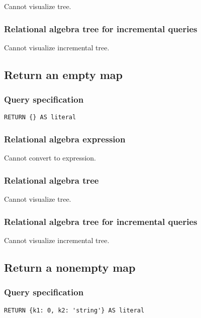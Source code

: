 Cannot visualize tree.

\subsubsection*{Relational algebra tree for incremental queries}

Cannot visualize incremental tree.

\subsection{Return an empty map}

\subsubsection*{Query specification}

\begin{lstlisting}
RETURN {} AS literal
\end{lstlisting}

\subsubsection*{Relational algebra expression}

Cannot convert to expression.

\subsubsection*{Relational algebra tree}

Cannot visualize tree.

\subsubsection*{Relational algebra tree for incremental queries}

Cannot visualize incremental tree.

\subsection{Return a nonempty map}

\subsubsection*{Query specification}

\begin{lstlisting}
RETURN {k1: 0, k2: 'string'} AS literal
\end{lstlisting}

